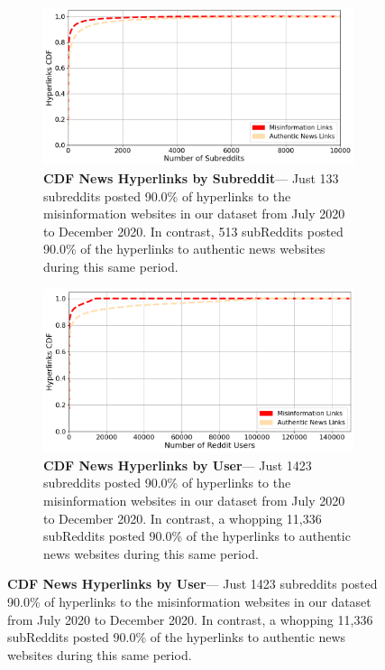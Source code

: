 \begin{figure}
\begin{subfigure}{.48\textwidth}
  \centering
  \includegraphics[width=1\linewidth]{figures/misinformation-authentic-cdf.png}
  \caption{\textbf{CDF News Hyperlinks by Subreddit}— Just 133 subreddits posted  90.0\% of hyperlinks to the misinformation websites in our dataset from July 2020 to December 2020. In contrast, 513 subReddits posted 90.0\% of the hyperlinks to authentic news websites during this same period. 
}
\label{fig:cdf-subreddit-hyperlinks}
\end{subfigure}%
\begin{subfigure}{.48\textwidth}
  \centering
  \includegraphics[width=1\linewidth]{figures/misinformation-authentic-users-cdf.png}
 \caption{\textbf{CDF News Hyperlinks by User}— Just 1423 subreddits posted  90.0\% of hyperlinks to the misinformation websites in our dataset from July 2020 to December 2020. In contrast, a whopping 11,336 subReddits posted 90.0\% of the hyperlinks to authentic news websites during this same period. 
}
 \label{fig:cdf-user-hyperlinks}
\end{subfigure}
\label{fig:cdf-hyperlinsk}
\end{figure}


